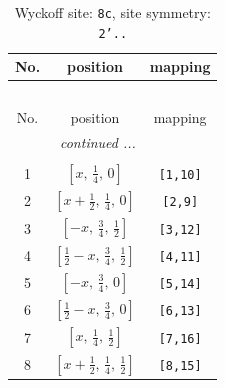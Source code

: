 \documentclass[fleqn,8pt]{jsarticle}
\begin{document}
\begin{longtable}{ccc}
\caption{Wyckoff site: {\tt 8c}, site symmetry: {\tt 2'..}}
 \\
 \hline \hline
No. & position & mapping \\ \hline \endfirsthead

\multicolumn{2}{l}{\tablename\ \thetable{}} \\
 \hline \hline
No. & position & mapping \\ \hline \endhead

 \hline \hline
\multicolumn{2}{r}{\footnotesize\it continued ...} \\ \endfoot

 \hline \hline
\multicolumn{2}{r}{} \\ \endlastfoot

1 & $\left[ x,\, \frac{1}{4},\, 0 \right]$ & {\tt [1,10]} \\ \hline
2 & $\left[ x + \frac{1}{2},\, \frac{1}{4},\, 0 \right]$ & {\tt [2,9]} \\ \hline
3 & $\left[ - x,\, \frac{3}{4},\, \frac{1}{2} \right]$ & {\tt [3,12]} \\ \hline
4 & $\left[ \frac{1}{2} - x,\, \frac{3}{4},\, \frac{1}{2} \right]$ & {\tt [4,11]} \\ \hline
5 & $\left[ - x,\, \frac{3}{4},\, 0 \right]$ & {\tt [5,14]} \\ \hline
6 & $\left[ \frac{1}{2} - x,\, \frac{3}{4},\, 0 \right]$ & {\tt [6,13]} \\ \hline
7 & $\left[ x,\, \frac{1}{4},\, \frac{1}{2} \right]$ & {\tt [7,16]} \\ \hline
8 & $\left[ x + \frac{1}{2},\, \frac{1}{4},\, \frac{1}{2} \right]$ & {\tt [8,15]} \\
\end{longtable}
\renewcommand{\arraystretch}{1.2}
\end{document}
